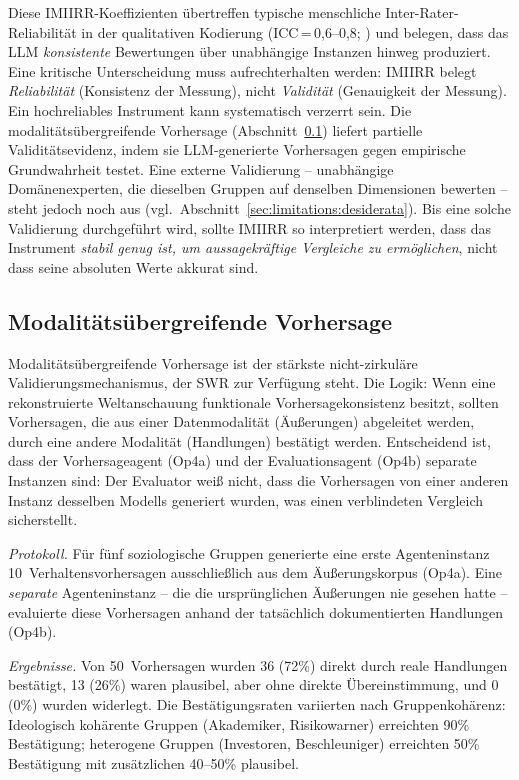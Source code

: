 \documentclass[11pt,a4paper]{article}
\begin{document}
Diese IMIIRR-Koeffizienten \"ubertreffen typische menschliche Inter-Rater-Reliabilit\"at in der qualitativen Kodierung (ICC\,=\,0,6--0,8; \citealp{Hallgren2012}) und belegen, dass das LLM \emph{konsistente} Bewertungen \"uber unabh\"angige Instanzen hinweg produziert. Eine kritische Unterscheidung muss aufrechterhalten werden: IMIIRR belegt \emph{Reliabilit\"at} (Konsistenz der Messung), nicht \emph{Validit\"at} (Genauigkeit der Messung). Ein hochreliables Instrument kann systematisch verzerrt sein. Die modalit\"ats\"ubergreifende Vorhersage (Abschnitt~\ref{sec:qa:crossmodal}) liefert partielle Validit\"atsevidenz, indem sie LLM-generierte Vorhersagen gegen empirische Grundwahrheit testet. Eine externe Validierung -- unabh\"angige Dom\"anenexperten, die dieselben Gruppen auf denselben Dimensionen bewerten -- steht jedoch noch aus (vgl.\ Abschnitt~\ref{sec:limitations:desiderata}). Bis eine solche Validierung durchgef\"uhrt wird, sollte IMIIRR so interpretiert werden, dass das Instrument \emph{stabil genug ist, um aussagekr\"aftige Vergleiche zu erm\"oglichen}, nicht dass seine absoluten Werte akkurat sind.


\subsection{Modalit\"ats\"ubergreifende Vorhersage}
\label{sec:qa:crossmodal}

Modalit\"ats\"ubergreifende Vorhersage ist der st\"arkste nicht-zirkul\"are Validierungsmechanismus, der SWR zur Verf\"ugung steht. Die Logik: Wenn eine rekonstruierte Weltanschauung funktionale Vorhersagekonsistenz besitzt, sollten Vorhersagen, die aus einer Datenmodalit\"at (\"Au\ss{}erungen) abgeleitet werden, durch eine andere Modalit\"at (Handlungen) best\"atigt werden. Entscheidend ist, dass der Vorhersageagent (Op4a) und der Evaluationsagent (Op4b) separate Instanzen sind: Der Evaluator wei\ss{} nicht, dass die Vorhersagen von einer anderen Instanz desselben Modells generiert wurden, was einen verblindeten Vergleich sicherstellt.

\emph{Protokoll.} F\"ur f\"unf soziologische Gruppen generierte eine erste Agenteninstanz 10~Verhaltensvorhersagen ausschlie\ss{}lich aus dem \"Au\ss{}erungskorpus (Op4a). Eine \emph{separate} Agenteninstanz -- die die urspr\"unglichen \"Au\ss{}erungen nie gesehen hatte -- evaluierte diese Vorhersagen anhand der tats\"achlich dokumentierten Handlungen (Op4b).

\emph{Ergebnisse.} Von 50~Vorhersagen wurden 36 (72\%) direkt durch reale Handlungen best\"atigt, 13 (26\%) waren plausibel, aber ohne direkte \"Ubereinstimmung, und 0 (0\%) wurden widerlegt. Die Best\"atigungsraten variierten nach Gruppenkoh\"arenz: Ideologisch koh\"arente Gruppen (Akademiker, Risikowarner) erreichten 90\% Best\"atigung; heterogene Gruppen (Investoren, Beschleuniger) erreichten 50\% Best\"atigung mit zus\"atzlichen 40--50\% plausibel.
\end{document}
